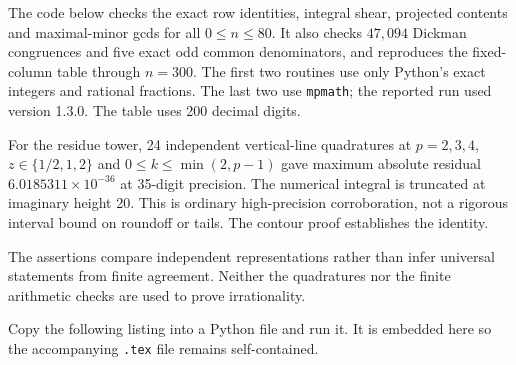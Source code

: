 \documentclass[11pt,a4paper]{article}
\theoremstyle{definition}
\theoremstyle{remark}
\numberwithin{equation}{section}
\begin{document}
The code below checks the exact row identities, integral shear, projected
contents and maximal-minor gcds for all $0\le n\le80$. It also checks
$47{,}094$ Dickman congruences and five exact odd common denominators,
and reproduces the fixed-column table through $n=300$.
The first two routines use only Python's exact integers and rational
fractions. The last two use \texttt{mpmath}; the reported run used
version 1.3.0. The table uses 200 decimal digits.

For the residue tower, 24 independent vertical-line quadratures at
$p=2,3,4$, $z\in\{1/2,1,2\}$ and $0\le k\le\min(2,p-1)$ gave
maximum absolute residual $6.0185311\times10^{-36}$ at 35-digit precision.
The numerical integral is truncated at imaginary height 20. This is
ordinary high-precision corroboration, not a rigorous interval bound
on roundoff or tails. The contour proof establishes the identity.

The assertions compare independent representations rather than infer
universal statements from finite agreement. Neither the quadratures nor
the finite arithmetic checks are used to prove irrationality.

Copy the following listing into a Python file and run it. It is embedded
here so the accompanying \texttt{.tex} file remains self-contained.
\end{document}

